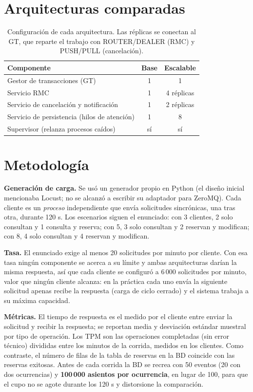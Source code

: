 \documentclass[10pt, a4paper]{article}
\begin{document}
\section{Arquitecturas comparadas}
\begin{table}[H]
	\centering\small
	\begin{tabular}{@{}lcc@{}}
		\toprule
		Componente & Base & Escalable \\
		\midrule
		Gestor de transacciones (GT) & 1 & 1 \\
		Servicio RMC & 1 & 4 réplicas \\
		Servicio de cancelación y notificación & 1 & 2 réplicas \\
		Servicio de persistencia (hilos de atención) & 1 & 8 \\
		Supervisor (relanza procesos caídos) & sí & sí \\
		\bottomrule
	\end{tabular}
	\caption{Configuración de cada arquitectura. Las réplicas se conectan al GT, que reparte el trabajo con ROUTER/DEALER (RMC) y PUSH/PULL (cancelación).}
\end{table}

\section{Metodología}
\label{sec:metodo}
\textbf{Generación de carga.} Se usó un generador propio en Python (el diseño inicial mencionaba Locust; no se alcanzó a escribir su adaptador para ZeroMQ). Cada cliente es un \emph{proceso} independiente que envía solicitudes sincrónicas, una tras otra, durante 120 s. Los escenarios siguen el enunciado: con 3 clientes, 2 solo consultan y 1 consulta y reserva; con 5, 3 solo consultan y 2 reservan y modifican; con 8, 4 solo consultan y 4 reservan y modifican.

\textbf{Tasa.} El enunciado exige al menos 20 solicitudes por minuto por cliente. Con esa tasa ningún componente se acerca a su límite y ambas arquitecturas darían la misma respuesta, así que cada cliente se configuró a 6\,000 solicitudes por minuto, valor que ningún cliente alcanza: en la práctica cada uno envía la siguiente solicitud apenas recibe la respuesta (carga de ciclo cerrado) y el sistema trabaja a su máxima capacidad.

\textbf{Métricas.} El tiempo de respuesta es el medido por el cliente entre enviar la solicitud y recibir la respuesta; se reportan media y desviación estándar muestral por tipo de operación. Los TPM son las operaciones completadas (sin error técnico) divididas entre los minutos de la corrida, medidos en los clientes. Como contraste, el número de filas de la tabla de reservas en la BD coincide con las reservas exitosas. Antes de cada corrida la BD se recrea con 50 eventos (20 con dos ocurrencias) y \textbf{100\,000 asientos por ocurrencia}, en lugar de 100, para que el cupo no se agote durante los 120 s y distorsione la comparación.
\end{document}
